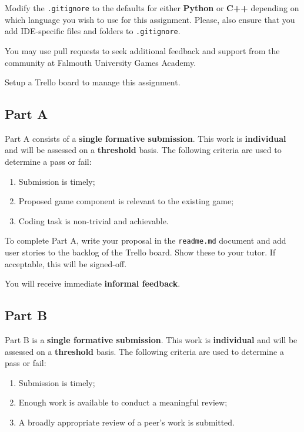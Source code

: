 \documentclass{../fal_assignment}
\begin{document}
Modify the \texttt{.gitignore} to the defaults for either \textbf{Python} or \textbf{C++} depending on which language you wish to use for this assignment. Please, also ensure that you add IDE-specific files and folders to \texttt{.gitignore}. 

You may use pull requests to seek additional feedback and support from the community at Falmouth University Games Academy.

Setup a Trello board to manage this assignment. 

\subsection*{Part A}

Part A consists of a \textbf{single formative submission}. This work is \textbf{individual} and will be assessed on a \textbf{threshold} basis. The following criteria are used to determine a pass or fail:

\begin{enumerate}[label=(\alph*)]
	\item Submission is timely;
	\item Proposed game component is relevant to the existing game;
	\item Coding task is non-trivial and achievable.
\end{enumerate}

To complete Part A, write your proposal in the \texttt{readme.md} document and add user stories to the backlog of the Trello board. Show these to your tutor.  If acceptable, this will be signed-off. 

You will receive immediate \textbf{informal feedback}.

\subsection*{Part B}

Part B is a \textbf{single formative submission}. This work is \textbf{individual} and will be assessed on a \textbf{threshold} basis. The following criteria are used to determine a pass or fail:

\begin{enumerate}[label=(\alph*)]
	\item Submission is timely;
	\item Enough work is available to conduct a meaningful review;
	\item A broadly appropriate review of a peer's work is submitted.
\end{enumerate}
\end{document}
